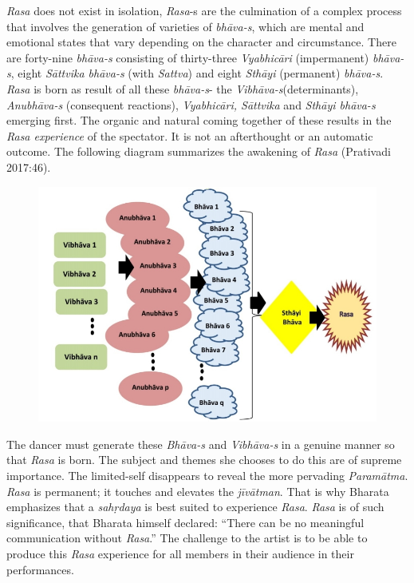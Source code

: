 \textit{Rasa} does not exist in isolation, \textit{Rasa}-s are the culmination of a complex process that involves the generation of varieties of \textit{bhāva-s}, which are mental and emotional states that vary depending on the character and circumstance. There are forty-nine \textit{bhāva-s }consisting of thirty-three \textit{Vyabhicāri} (impermanent) \textit{bhāva-s}, eight \textit{Sāttvika bhāva-s} (with \textit{Sattva}) and eight \textit{Sthāyi} (permanent) \textit{bhāva-s}. \textit{Rasa} is born as result of all these \textit{bhāva-s}- the \textit{Vibhāva-s}(determinants), \textit{Anubhāva-s} (consequent reactions), \textit{Vyabhicāri, Sāttvika} and \textit{Sthāyi bhāva-s }emerging first. The organic and natural coming together of these results in the \textit{Rasa experience }of the spectator. It is not an afterthought or an automatic outcome. The following diagram summarizes the awakening of \textit{Rasa} (Prativadi 2017:46).

\begin{figure}[!htbp]
\includegraphics[scale=1.21]{"images/11-01.jpg"}
\end{figure}

The dancer must generate these \textit{Bhāva-s} and \textit{Vibhāva-s} in a genuine manner so that \textit{Rasa} is born. The subject and themes she chooses to do this are of supreme importance. The limited-self disappears to reveal the more pervading \textit{Paramātma}. \textit{Rasa} is permanent; it touches and elevates the \textit{jīvātman}. That is why Bharata emphasizes that a \textit{sahṛdaya} is best suited to experience \textit{Rasa}. \textit{Rasa} is of such significance, that Bharata himself declared: “There can be no meaningful communication without \textit{Rasa}.” The challenge to the artist is to be able to produce this \textit{Rasa} experience for all members in their audience in their performances.

